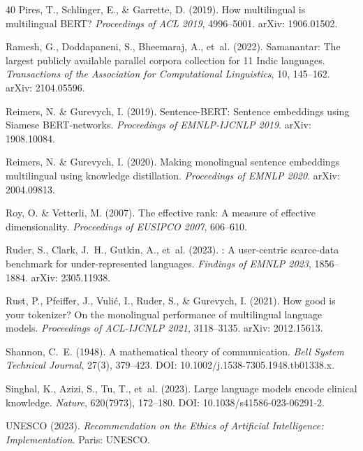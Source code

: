 \documentclass[11pt,a4paper]{article}
\begin{document}
\begin{thebibliography}{40}
Pires, T., Schlinger, E., \& Garrette, D. (2019).
\newblock How multilingual is multilingual {BERT}?
\newblock \emph{Proceedings of ACL 2019}, 4996--5001.
\newblock arXiv: 1906.01502.

Ramesh, G., Doddapaneni, S., Bheemaraj, A., et~al. (2022).
\newblock Samanantar: The largest publicly available parallel corpora collection for
11 {Indic} languages.
\newblock \emph{Transactions of the Association for Computational Linguistics}, 10,
145--162.
\newblock arXiv: 2104.05596.

Reimers, N. \& Gurevych, I. (2019).
\newblock Sentence-{BERT}: Sentence embeddings using {Siamese BERT}-networks.
\newblock \emph{Proceedings of EMNLP-IJCNLP 2019}.
\newblock arXiv: 1908.10084.

Reimers, N. \& Gurevych, I. (2020).
\newblock Making monolingual sentence embeddings multilingual using knowledge
distillation.
\newblock \emph{Proceedings of EMNLP 2020}.
\newblock arXiv: 2004.09813.

Roy, O. \& Vetterli, M. (2007).
\newblock The effective rank: A measure of effective dimensionality.
\newblock \emph{Proceedings of EUSIPCO 2007}, 606--610.

Ruder, S., Clark, J.~H., Gutkin, A., et~al. (2023).
: A user-centric scarce-data benchmark for under-represented
languages.
\newblock \emph{Findings of EMNLP 2023}, 1856--1884.
\newblock arXiv: 2305.11938.

Rust, P., Pfeiffer, J., Vuli\'{c}, I., Ruder, S., \& Gurevych, I. (2021).
\newblock How good is your tokenizer? {O}n the monolingual performance of multilingual
language models.
\newblock \emph{Proceedings of ACL-IJCNLP 2021}, 3118--3135.
\newblock arXiv: 2012.15613.

Shannon, C.~E. (1948).
\newblock A mathematical theory of communication.
\newblock \emph{Bell System Technical Journal}, 27(3), 379--423.
\newblock DOI: 10.1002/j.1538-7305.1948.tb01338.x.

Singhal, K., Azizi, S., Tu, T., et~al. (2023).
\newblock Large language models encode clinical knowledge.
\newblock \emph{Nature}, 620(7973), 172--180.
\newblock DOI: 10.1038/s41586-023-06291-2.

{UNESCO} (2023).
\newblock \emph{Recommendation on the Ethics of Artificial Intelligence:
Implementation}.
\newblock Paris: UNESCO.

\end{thebibliography}
\end{document}
